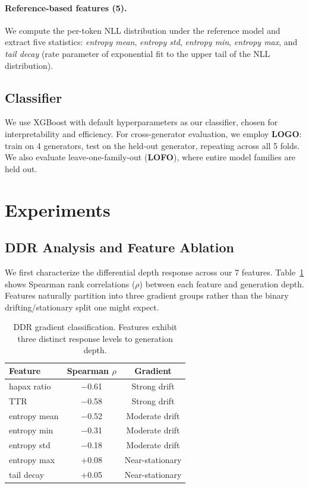 \documentclass[11pt,a4paper]{article}
\begin{document}
\paragraph{Reference-based features (5).}
We compute the per-token NLL distribution under the reference model and extract five statistics: \emph{entropy mean}, \emph{entropy std}, \emph{entropy min}, \emph{entropy max}, and \emph{tail decay} (rate parameter of exponential fit to the upper tail of the NLL distribution).

\subsection{Classifier}

We use XGBoost \cite{chen2016xgboost} with default hyperparameters as our classifier, chosen for interpretability and efficiency.
For cross-generator evaluation, we employ \textbf{LOGO}: train on 4 generators, test on the held-out generator, repeating across all 5 folds.
We also evaluate leave-one-family-out (\textbf{LOFO}), where entire model families are held out.

\section{Experiments}

\subsection{DDR Analysis and Feature Ablation}
\label{sec:ddr}

We first characterize the differential depth response across our 7 features.
Table~\ref{tab:ddr_gradient} shows Spearman rank correlations ($\rho$) between each feature and generation depth.
Features naturally partition into three gradient groups rather than the binary drifting/stationary split one might expect.

\begin{table}[t]
\centering
\small
\caption{DDR gradient classification. Features exhibit three distinct response levels to generation depth.}
\label{tab:ddr_gradient}
\begin{tabular}{lcc}
\toprule
\textbf{Feature} & \textbf{Spearman $\rho$} & \textbf{Gradient} \\
\midrule
hapax ratio & $-$0.61 & Strong drift \\
TTR & $-$0.58 & Strong drift \\
\midrule
entropy mean & $-$0.52 & Moderate drift \\
entropy min & $-$0.31 & Moderate drift \\
entropy std & $-$0.18 & Moderate drift \\
\midrule
entropy max & $+$0.08 & Near-stationary \\
tail decay & $+$0.05 & Near-stationary \\
\bottomrule
\end{tabular}
\end{table}
\end{document}
